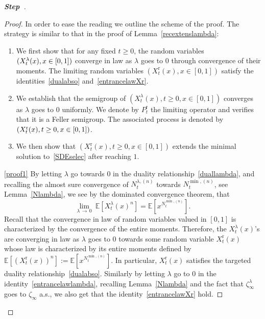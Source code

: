 \documentclass[10pt]{amsart}
\theoremstyle{definition}\newtheorem{defi}[theo]{Definition}\newtheorem{rema}[theo]{Remark}\newtheorem{exam}[theo]{Example}\newtheorem{exem}[theo]{Example}\newtheorem{nota}[theo]{Notation}
\newcommand{\rmr}{\mathrm{r}}
\newcommand{\bbE}{\mathbb{E}}
\newcounter{stepcount}
\newenvironment{step}{\refstepcounter{stepcount}\begin{proof}[\textbf{Step~\thestepcount}]}{\end{proof}}
\begin{document}
\begin{step}
\begin{proof}
In order to ease the reading we outline the scheme of the proof. The strategy is similar to that in the proof of Lemma~\ref{recextenslambda}:
\begin{enumerate}
\item\label{proof1} We first show that for any fixed $t\geq 0$, the random variables $(X_t^{\lambda}(x),\linebreak x \in[0,1])$ converge in law as $\lambda$ goes to $0$ through convergence of their moments. The limiting random variables $(X_t^{\rmr}(x),x\in [0,1])$ satisfy the identities~\eqref{dualabso} and~\eqref{entrancelawXr}.
\item\label{proof2} We establish that the semigroup of $(X^{\lambda}_t(x),t\geq 0, x\in [0,1])$ converges as $\lambda$ goes to $0$ uniformly. We denote by $P_t^{\rmr}$ the limiting operator and verifies that it is a Feller semigroup. The associated process is denoted by $(X^{\rmr}_t(x),\linebreak t\geq 0,x\in [0,1])$.
\item\label{proof3} We then show that $(X^{\rmr}_t(x),t\geq 0,x\in [0,1])$ extends the minimal solution to~\eqref{SDEselec} after reaching $1$.
\end{enumerate}
\eqref{proof1} By letting $\lambda$ go towards $0$ in the duality relationship~\eqref{duallambda}, and recalling the almost sure convergence of $N_t^{\lambda,(n)}$ towards $N_t^{\min,(n)}$, see Lemma~\ref{Nlambda}, we see by the dominated convergence theorem, that
\[
\underset{\lambda\,\rightarrow\,0}{\lim}\ \bbE\left[X_t^{\lambda}(x)^{n}\right]=\bbE\left[x^{N_t^{\min,(n)}}\right].
\]
Recall that the convergence in law of random variables valued in $[0,1]$ is characterized by the convergence of the entire moments. Therefore, the $X_t^{\lambda}(x)$'s are converging in law as $\lambda$ goes to $0$ towards some random variable $X_t^{\rmr}(x)$ whose law is characterized by its entire moments defined by $\bbE[(X^{\rmr}_t(x))^{n}]:=\bbE[x^{N_t^{\min,(n)}}]$. In particular, $X_t^{\rmr}(x)$ satisfies the targeted duality relationship~\eqref{dualabso}. Similarly by letting $\lambda$ go to $0$ in the identity~\eqref{entrancelawlambda}, recalling Lemma~\ref{Nlambda} and the fact that $\zeta_\infty^{\lambda}$ goes to $\zeta_{\infty}$ a.s., we also get that the identity~\eqref{entrancelawXr} hold.


\end{proof}
\end{step}
\end{document}
